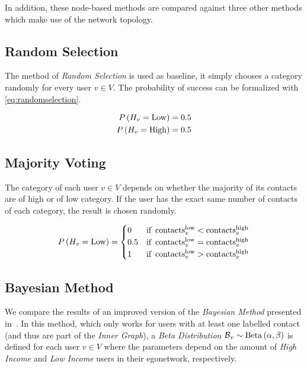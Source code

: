 In addition, these node-based methods are compared against three other methods which make use of the network topology.

\subsection{Random Selection}

The method of \emph{Random Selection} is used as baseline, it simply chooses a category randomly for every user $v \in V$. The probability of success can be formalized with \cref{eq:randomselection}.

\begin{equation}
\label{eq:randomselection}
\begin{aligned}
	P \left( H_v = \operatorname{Low} \right) &= 0.5 \\
	P \left( H_v = \operatorname{High} \right) &= 0.5
\end{aligned}
\end{equation}

\subsection{Majority Voting}

The category of each user $v \in V$ depends on whether the majority of its contacts are of high or of low category. If the user has the exact same number of contacts of each category, the result is chosen randomly.

\begin{equation}
\label{eq:majorityvoting}
	P \left( H_v = \operatorname{Low} \right) =
	\begin{cases}
		0 & \text{if} \ \operatorname{contacts}^{\operatorname{low}}_v < \operatorname{contacts}^{\operatorname{high}}_v \\
		0.5 & \text{if} \ \operatorname{contacts}^{\operatorname{low}}_v = \operatorname{contacts}^{\operatorname{high}}_v \\
		1 & \text{if} \ \operatorname{contacts}^{\operatorname{low}}_v > \operatorname{contacts}^{\operatorname{high}}_v
	\end{cases}
\end{equation}

\subsection{Bayesian Method}

We compare the results of an improved version of the \emph{Bayesian Method} presented in~\cite{fixmanasonam2016}. In this method, which only works for users with at least one labelled contact (and thus are part of the \emph{Inner Graph}), a \emph{Beta Distribution} $\operatorname{\mathcal{B}}_v \sim \operatorname{Beta} \left( \alpha, \beta \right)$ is defined for each user $v \in V$ where the parameters depend on the amount of \emph{High Income} and \emph{Low Income} users in their egonetwork, respectively.

